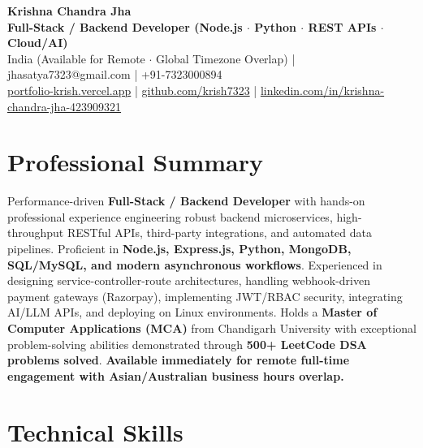 \documentclass[a4paper,10pt]{article}
\begin{document}
\begin{center}

    {\LARGE \textbf{Krishna Chandra Jha}} \\[2.5pt]

    \textbf{Full-Stack / Backend Developer (Node.js $\cdot$ Python $\cdot$ REST APIs $\cdot$ Cloud/AI)} \\[3.5pt]

    India (Available for Remote $\cdot$ Global Timezone Overlap)
    \quad | \quad
    jhasatya7323@gmail.com
    \quad | \quad
    +91-7323000894
    \\[2.5pt]

    \href{https://portfolio-ashen-alpha-dv0whhsamo.vercel.app/}{portfolio-krish.vercel.app}
    \quad | \quad
    \href{https://github.com/krish7323}{github.com/krish7323}
    \quad | \quad
    \href{https://linkedin.com/in/krishna-chandra-jha-423909321}
    {linkedin.com/in/krishna-chandra-jha-423909321}

\end{center}

\section*{Professional Summary}

Performance-driven \textbf{Full-Stack / Backend Developer} with hands-on professional experience engineering robust backend microservices, high-throughput RESTful APIs, third-party integrations, and automated data pipelines. Proficient in \textbf{Node.js, Express.js, Python, MongoDB, SQL/MySQL, and modern asynchronous workflows}. Experienced in designing service-controller-route architectures, handling webhook-driven payment gateways (Razorpay), implementing JWT/RBAC security, integrating AI/LLM APIs, and deploying on Linux environments. Holds a \textbf{Master of Computer Applications (MCA)} from Chandigarh University with exceptional problem-solving abilities demonstrated through \textbf{500+ LeetCode DSA problems solved}. \textbf{Available immediately for remote full-time engagement with Asian/Australian business hours overlap.}

\section*{Technical Skills}
\end{document}
